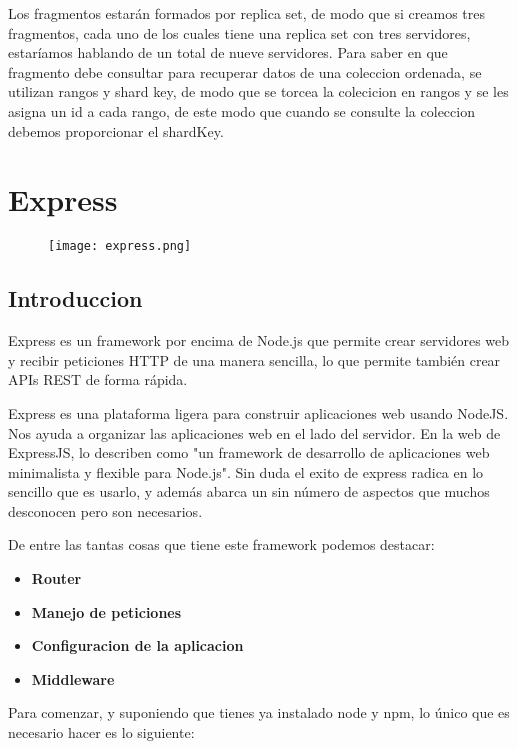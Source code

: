 Los fragmentos estarán formados por replica set, de modo que
si creamos tres fragmentos, cada uno de los cuales tiene una
replica set con tres servidores, estaríamos hablando de un
total de nueve servidores. Para saber en que fragmento debe
consultar para recuperar datos de una coleccion ordenada, se
utilizan rangos y shard key, de modo que se torcea la colecicion en rangos y se les asigna un id a cada rango, de este modo que cuando se consulte la coleccion debemos proporcionar el shardKey.




\section{Express}

\begin{figure}[H]
    \centering
    \texttt{[image: express.png]}
\end{figure}

\subsection{Introduccion}
Express es un framework por encima de Node.js que permite crear servidores web y recibir peticiones HTTP de una manera sencilla, lo que permite también crear APIs REST de forma rápida.

Express es una plataforma ligera para construir aplicaciones web usando NodeJS. Nos ayuda a organizar las aplicaciones web en el lado del servidor. En la web de ExpressJS, lo describen como "un framework de desarrollo de aplicaciones web minimalista y flexible para Node.js". Sin duda el exito de express radica en lo sencillo que es usarlo, y además abarca un sin número de aspectos que muchos desconocen pero son necesarios.

De entre las tantas cosas que tiene este framework podemos destacar:

\begin{itemize}

\item \textbf{Router}
\item \textbf{Manejo de peticiones}
\item \textbf{Configuracion de la aplicacion}
\item \textbf{Middleware}
\end{itemize}

Para comenzar, y suponiendo que tienes ya instalado node y npm, lo único que es necesario hacer es lo siguiente:

